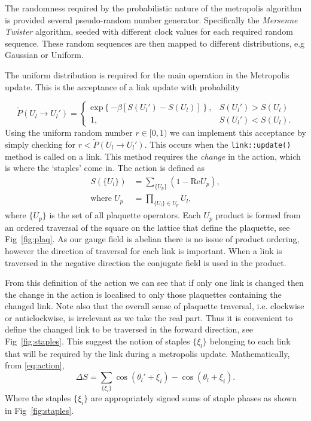 \documentclass[12pt]{article}
\begin{document}
\par The randomness required by the probabilistic nature of the metropolis algorithm is provided several pseudo-random number generator. Specifically the \emph{Mersenne Twister} algorithm, seeded with different clock values for each required random sequence. These random sequences are then mapped to different distributions, e.g Gaussian or Uniform.

\par The uniform distribution is required for the main operation in the Metropolis update. This is the acceptance of a link update with probability 

\begin{equation}
\tilde{P}(U_l \rightarrow U_l') =  \begin{cases} 
      \mathrm{exp}\left\{-\beta \left[S(U_l')-S(U_l) \right]\right\}, & S(U_l') > S(U_l) \\    
      1, &  S(U_l') < S(U_l).
   \end{cases}
\end{equation}
Using the uniform random number $r \in [0,1)$ we can implement this acceptance by simply checking for $r<\tilde{P}(U_l \rightarrow U_l')$. This occurs when the \texttt{link::update()} method is called on a link. This method requires the \emph{change} in the action, which is where the `staples' come in. The action is defined as
\begin{align}
    \label{eq:action}
    S(\{U_l\}) &= \sum_{\{U_p\}}(1-\mathrm{Re}{U_p}),\\
    \mathrm{where} \; U_p &= \prod_{\{U_l\} \in U_p} U_l,
\end{align}
where $\{U_p\}$ is the set of all plaquette operators. Each $U_p$ product is formed from an ordered traversal of the square on the lattice that define the plaquette, see Fig~\ref{fig:plaq}. As our gauge field is abelian there is no issue of product ordering, however the direction of traversal for each link is important. When a link is traversed in the negative direction the conjugate field is used in the product.

\par From this definition of the action we can see that if only one link is changed then the change in the action is localised to only those plaquettes containing the changed link. Note also that the overall sense of plaquette traversal, i.e. clockwise or anticlockwise, is irrelevant as we take the real part. Thus it is convenient to define the changed link to be traversed in the forward direction, see Fig~\ref{fig:staples}. This suggest the notion of staples $\{\xi_l\}$ belonging to each link that will be required by the link during a metropolis update. Mathematically, from \eqref{eq:action}, \begin{equation}
    \Delta S = \sum_{\{\xi_i\}} \cos(\theta_l' + \xi_i) - \cos(\theta_l + \xi_i).
\end{equation}
Where the staples $\{\xi_i\}$ are appropriately signed sums of staple phases as shown in Fig~\ref{fig:staples}.
\end{document}
